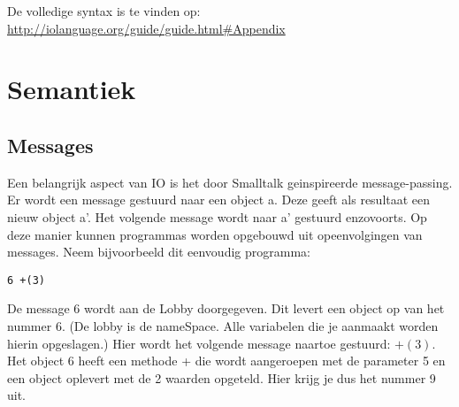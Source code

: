 \documentclass[12pt]{article}
\begin{document}
De volledige syntax is te vinden op: \url{http://iolanguage.org/guide/guide.html#Appendix}

\section{Semantiek}

\subsection{Messages}
Een belangrijk aspect van IO is het door Smalltalk geinspireerde message-passing. Er wordt een message gestuurd naar een object a. Deze geeft als resultaat een nieuw object a'. Het volgende message wordt naar a' gestuurd enzovoorts.  Op deze manier kunnen programmas worden opgebouwd uit opeenvolgingen van messages. Neem bijvoorbeeld dit eenvoudig programma:
\begin{lstlisting}[frame=single]
6 +(3)
\end{lstlisting}
De message 6 wordt aan de Lobby doorgegeven. Dit levert een object op van het nummer $6$. (De lobby is de nameSpace. Alle variabelen die je aanmaakt worden hierin opgeslagen.) Hier wordt het volgende message naartoe gestuurd: $+(3)$. Het object 6 heeft een methode + die wordt aangeroepen met de parameter 5 en een object oplevert met de 2 waarden opgeteld. Hier krijg je dus het nummer 9 uit.  

\end{document}
